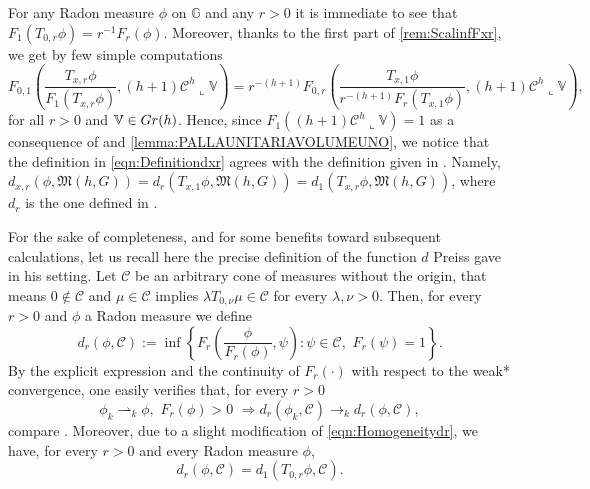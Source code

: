 \documentclass[10pt, a4paper,
oneside, headinclude,footinclude]{scrartcl}
\begin{document}
\begin{osservazione}\label{rem:ScalingDandF}
For any Radon measure $\phi$ on $\mathbb{G}$ and any $r>0$ it is immediate to see that $F_1(T_{0,r}\phi)=r^{-1}F_r(\phi)$. Moreover, thanks to the first part of \cref{rem:ScalinfFxr}, we get by few simple computations 
\begin{equation}\label{eqn:Homogeneitydr}
F_{0,1}\left(\frac{T_{x,r}\phi}{F_1(T_{x,r}\phi)},(h+1)\mathcal{C}^h\llcorner\mathbb V\right)=r^{-(h+1)}F_{0,r}\left(\frac{T_{x,1}\phi}{r^{-(h+1)}F_r(T_{x,1}\phi)},(h+1)\mathcal{C}^h\llcorner\mathbb V\right),
\end{equation}
for all $r>0$ and $\mathbb V\in Gr(h)$. Hence, since $F_1((h+1)\mathcal{C}^h\llcorner\mathbb V)=1$ as a consequence of \cite[Proposition 2.12]{antonelli2020rectifiable} and \cref{lemma:PALLAUNITARIAVOLUMEUNO}, we notice that the definition in \eqref{eqn:Definitiondxr} agrees with the definition given in \cite[\S 2.1(3)]{Preiss1987GeometryDensities}. Namely, $d_{x,r}(\phi,\mathfrak M(h,G))=d_r(T_{x,1}\phi,\mathfrak M(h,G))=d_1(T_{x,r}\phi,\mathfrak M(h,G))$, where $d_r$ is the one defined in \cite[\S 2.1(3)]{Preiss1987GeometryDensities}. 

 For the sake of completeness, and for some benefits toward subsequent calculations, let us recall here the precise definition of the function $d$ Preiss gave in his setting. Let $\mathscr{C}$ be an arbitrary cone of measures without the origin, that means $0\not\in\mathscr{C}$ and $\mu\in\mathscr{C}$ implies $\lambda T_{0,\nu}\mu\in\mathscr{C}$ for every $\lambda,\nu>0$. Then, for every $r>0$ and $\phi$ a Radon measure we define
 \begin{equation}\label{eqn:drPreiss}
 d_r(\phi,\mathscr{C}):=\inf \left\{F_{r}\left(\frac{\phi}{F_r(\phi)},\psi\right):\psi\in\mathscr{C},\,\,F_r(\psi)=1\right\}.
 \end{equation}
 By the explicit expression and the continuity of $F_r(\cdot)$ with respect to the weak* convergence, one easily verifies that, for every $r>0$
 \begin{equation}\label{eqn:ContinuitydrPreiss}
 \phi_k\rightharpoonup_{k}\phi,\,\,F_r(\phi)>0\,\, \Rightarrow d_r(\phi_k,\mathscr{C})\to_{k} d_r(\phi,\mathscr{C}),
 \end{equation}
 compare \cite[2.1(6)]{Preiss1987GeometryDensities}. Moreover, due to a slight modification of \eqref{eqn:Homogeneitydr}, we have, for every $r>0$ and every Radon measure $\phi$, 
 \begin{equation}\label{eqn:HomogeneityPreiss}
   d_r(\phi,\mathscr{C})=d_1(T_{0,r}\phi,\mathscr{C}).  
 \end{equation}
\end{osservazione}
\end{document}
